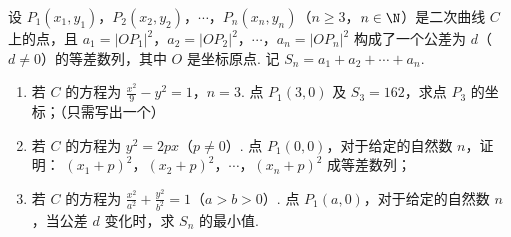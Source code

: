\begin{problem}
设 \(P_{1}\left(x_{1},y_{1}\right)\)，\(P_{2}\left(x_{2},y_{2}\right)\)，\(\cdots\)，\(P_{n}\left(x_{n},y_{n}\right)\)（\(n \geqslant 3\)，\(n \in \N\)）是二次曲线 \(C\) 上的点，且 \(a_{1} = |OP_{1}|^{2}\)，\(a_{2} = |OP_{2}|^{2}\)，\(\cdots\)，\(a_{n} = |OP_{n}|^{2}\) 构成了一个公差为 \(d\)（\(d \neq 0\)）的等差数列，其中 \(O\) 是坐标原点. 记 \(S_{n} = a_{1} + a_{2} + \cdots + a_{n}\).

\begin{enumerate}
\item 若 \(C\) 的方程为 \(\frac{x^2}{9} - y^2 = 1\)，\(n = 3\). 点 \(P_{1}\left(3,0\right)\) 及 \(S_{3} = 162\)，求点 \(P_{3}\) 的坐标；（只需写出一个）
\item 若 \(C\) 的方程为 \(y^{2} = 2px\)（\(p \neq 0\)）. 点 \(P_{1}\left(0,0\right)\)，对于给定的自然数 \(n\)，证明： \((x_{1} + p)^{2}\)，\((x_{2} + p)^{2}\)，\(\cdots\)，\((x_{n} + p)^{2}\) 成等差数列；
\item 若 \(C\) 的方程为 \(\frac{x^2}{a^2} + \frac{y^2}{b^2} = 1\)（\(a > b > 0\)）. 点 \(P_{1}\left(a,0\right)\)，对于给定的自然数 \(n\)，当公差 \(d\) 变化时，求 \(S_{n}\) 的最小值.
\end{enumerate}
\end{problem}

